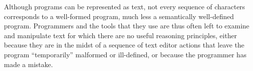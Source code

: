 






Although programs can be represented as text, not
every sequence of characters corresponds to a well-formed program, much
less a semantically well-defined program. Programmers and the tools that they use are thus 
often left to examine and manipulate text for which there are no useful
reasoning principles, either because they are in the midst of a sequence of
text editor actions that leave the program ``temporarily'' malformed or ill-defined, or because the programmer has made a mistake.

